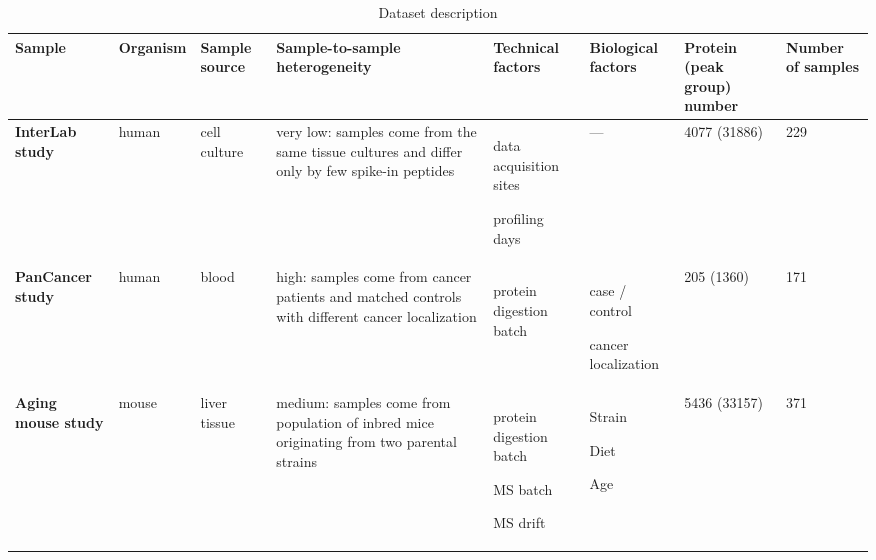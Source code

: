 \documentclass[num-refs]{wiley-article}
\newcommand{\squishlist}{%
	\begin{list}{-}%
		{\setlength{\itemsep}{0pt}
			\setlength{\parsep}{0pt}
			\setlength{\topsep}{0pt}
			\setlength{\partopsep}{0pt}
			\setlength{\leftmargin}{1em}
			\setlength{\labelwidth}{1em}
			\setlength{\labelsep}{0.5em}}}
\newcommand{\squishend}{\end{list}}
\begin{document}
\begin{landscape}
	\begin{table}
		\renewcommand*{\arraystretch}{1.8}
		\caption[Dataset description]{Dataset description}
		\label{tab:batch_datasets}
		\small
		\begin{tabular}{|  m{1.75cm}|  m{1.15cm} |  >{\raggedright}m{1.5cm} | >{\raggedright}m{4.13cm} |  m{2.5cm} |  >{\raggedright}m{2.2cm} |  m{1.5cm} |  m{1.5cm} |}
			\hline
			\textbf{Sample} & \textbf{Organism} & \textbf{Sample source} & \textbf{Sample-to-sample heterogeneity} & \textbf{Technical factors} & \textbf{Biological factors} & \textbf{Protein (peak group) number} & \textbf{Number of samples} \\
			\hline
			\hline
			\textbf{InterLab study} & human & cell culture & very low: 
			samples come from the same tissue cultures and differ only by few spike-in peptides
			& \vspace*{1em}\squishlist
			\item data acquisition sites
			\item profiling days
			\squishend
			& --- & 4077
			(31886)
			& 229  \\
			\hline
			\textbf{PanCancer study} & human & blood & high: 
			samples come from cancer patients and matched controls with different cancer localization
			& \squishlist
			\item protein digestion batch
			\squishend
			& \squishlist
			\item case / control
			\item cancer localization
			\squishend
			& 205 (1360)
			& 171  \\
			\hline
			\textbf{Aging mouse study} & mouse & liver tissue & medium: 
			samples come from population of inbred mice originating from two parental strains
			&  \vspace*{1em}\squishlist
			\item protein digestion batch
			\item MS batch
			\item MS drift
			\squishend
			& \squishlist
			\item Strain
			\item Diet
			\item Age
			\squishend
			& 5436
			(33157)\footnotemark
			& 371  \\
			\hline
		\end{tabular}
	\end{table}
\end{landscape}
\end{document}
